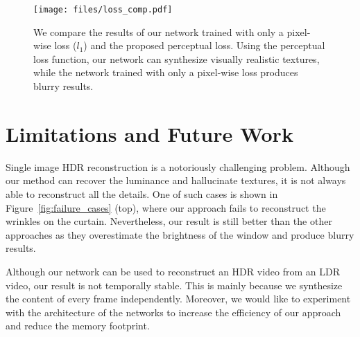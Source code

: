 \begin{figure}
  \texttt{[image: files/loss\_comp.pdf]}
  \vspace{-0.30in}
  \caption{We compare the results of our network trained with only a pixel-wise loss ($l_1$) and the proposed perceptual loss. Using the perceptual loss function, our network can synthesize visually realistic textures, while the network trained with only a pixel-wise loss produces blurry results.}
  \label{fig:loss_comp}
  \vspace{-0.20in}
\end{figure}





\section{Limitations and Future Work}



Single image HDR reconstruction is a notoriously challenging problem. Although our method can recover the luminance and hallucinate textures, it is not always able to reconstruct all the details. One of such cases is shown in Figure~\ref{fig:failure_cases} (top), where our approach fails to reconstruct the wrinkles on the curtain. Nevertheless, our result is still better than the other approaches as they overestimate the brightness of the window and produce blurry results. 

Although our network can be used to reconstruct an HDR video from an LDR video, our result is not temporally stable. This is mainly because we synthesize the content of every frame independently.  Moreover, we would like to experiment with the architecture of the networks to increase the efficiency of our approach and reduce the memory footprint.


